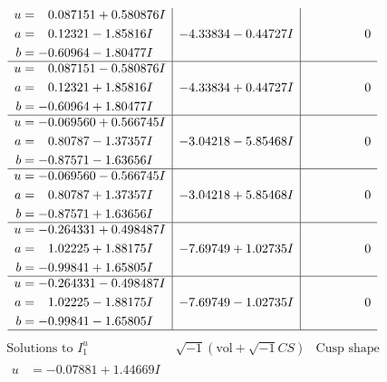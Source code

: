 \documentclass[1p]{elsarticle_modified}
\theoremstyle{definition}
\newcommand{\I}{\sqrt{-1}}
\begin{document}
$$\begin{array}{c|c|c}
\begin{aligned}
u &= \phantom{-}0.087151 + 0.580876 I \\
a &= \phantom{-}0.12321 - 1.85816 I \\
b &= -0.60964 - 1.80477 I\end{aligned}
 & -4.33834 - 0.44727 I & \phantom{-0.000000 } 0 \\ \hline\begin{aligned}
u &= \phantom{-}0.087151 - 0.580876 I \\
a &= \phantom{-}0.12321 + 1.85816 I \\
b &= -0.60964 + 1.80477 I\end{aligned}
 & -4.33834 + 0.44727 I & \phantom{-0.000000 } 0 \\ \hline\begin{aligned}
u &= -0.069560 + 0.566745 I \\
a &= \phantom{-}0.80787 - 1.37357 I \\
b &= -0.87571 - 1.63656 I\end{aligned}
 & -3.04218 - 5.85468 I & \phantom{-0.000000 } 0 \\ \hline\begin{aligned}
u &= -0.069560 - 0.566745 I \\
a &= \phantom{-}0.80787 + 1.37357 I \\
b &= -0.87571 + 1.63656 I\end{aligned}
 & -3.04218 + 5.85468 I & \phantom{-0.000000 } 0 \\ \hline\begin{aligned}
u &= -0.264331 + 0.498487 I \\
a &= \phantom{-}1.02225 + 1.88175 I \\
b &= -0.99841 + 1.65805 I\end{aligned}
 & -7.69749 + 1.02735 I & \phantom{-0.000000 } 0 \\ \hline\begin{aligned}
u &= -0.264331 - 0.498487 I \\
a &= \phantom{-}1.02225 - 1.88175 I \\
b &= -0.99841 - 1.65805 I\end{aligned}
 & -7.69749 - 1.02735 I & \phantom{-0.000000 } 0\\
 \hline 
 \end{array}$$\newpage$$\begin{array}{c|c|c}  
\text{Solutions to }I^u_{1}& \I (\text{vol} + \sqrt{-1}CS) & \text{Cusp shape}\\
 \hline 
\begin{aligned}
u &= -0.07881 + 1.44669 I \\

\end{aligned}
\end{array}$$
\end{document}
